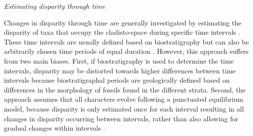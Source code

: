 \documentclass[12pt,letterpaper]{article}
\renewcommand{\subsection}[1]{%
\bigskip
\begin{center}
\begin{large}
\normalfont\itshape #1
\end{large}
\end{center}}
\begin{document}
\subsection{Estimating disparity through time} %
Changes in disparity through time are generally investigated by estimating the disparity of taxa that occupy the cladisto-space during specific time intervals \citep[e.g][]{cisneros2010,prentice2011,Hughes20082013,hopkinsdecoupling2013,bentonmodels2014,bensonfaunal2014}.
These time intervals are usually defined based on biostratigraphy \citep[e.g.][]{cisneros2010,prentice2011,Hughes20082013,bentonmodels2014} but can also be arbitrarily chosen time periods of equal duration \citep{hopkinsdecoupling2013,bensonfaunal2014}.
However, this approach suffers from two main biases. 
First, if biostratigraphy is used to determine the time intervals, disparity may be distorted towards higher differences between time intervals because biostratigraphal %
 periods are geologically defined based on differences in the morphology of fossils found in the different strata.
Second, the approach assumes that all characters evolve following a punctuated equilibrium model, because disparity is only estimated once for each interval resulting in all changes in disparity occurring between intervals, rather than also allowing for gradual changes within intervals \citep{Hunt21042015}.
\end{document}
